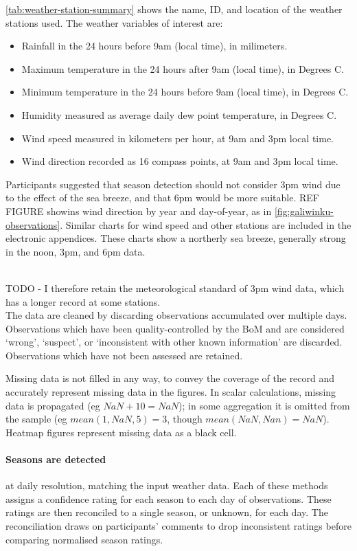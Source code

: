 \autoref{tab:weather-station-summary} shows the name, ID, and location of
the weather stations used.
%
The weather variables of interest are:
\begin{itemize}
\item Rainfall in the 24 hours before 9am (local time), in milimeters.
\item Maximum temperature in the 24 hours after 9am (local time), in Degrees C.
\item Minimum temperature in the 24 hours before 9am (local time), in Degrees C.
\item Humidity measured as average daily dew point temperature, in Degrees C.
\item Wind speed measured in kilometers per hour, at 9am and 3pm local time.
\item Wind direction recorded as 16 compass points, at 9am and 3pm local time.
\end{itemize}

Participants suggested that season detection should not consider 3pm wind
due to the effect of the sea breeze, and that 6pm would be more suitable.
REF FIGURE showins wind direction by year and day-of-year, as in
\autoref{fig:galiwinku-observations}.  Similar charts for wind speed and
other stations are included in the electronic appendices.
These charts show a northerly sea breeze, generally strong in the noon, 3pm,
and 6pm data.

~\\

TODO - I therefore retain the meteorological standard of
3pm wind data, which has a longer record at some stations.\\

The data are cleaned by discarding observations accumulated over multiple days.
Observations which have been quality-controlled by the BoM and are considered
`wrong', `suspect', or `inconsistent with other known information' are discarded.
Observations which have not been assessed are retained.

Missing data is not filled in any way, to convey the coverage of the record
and accurately represent missing data in the figures.  In scalar calculations,
missing data is propagated (eg ${NaN+10=NaN}$); in some aggregation
it is omitted from the sample (eg ${mean(1,NaN,5)=3}$, though
${mean(NaN,Nan)=NaN}$). Heatmap figures represent missing data as a black cell.


\paragraph{Seasons are detected} at daily resolution, matching the input
weather data.
Each of these methods assigns a confidence rating for each season to each day of
observations.  These ratings are then reconciled to a single season, or unknown,
for each day.  The reconciliation draws on participants' comments to drop inconsistent
ratings before comparing normalised season ratings.

